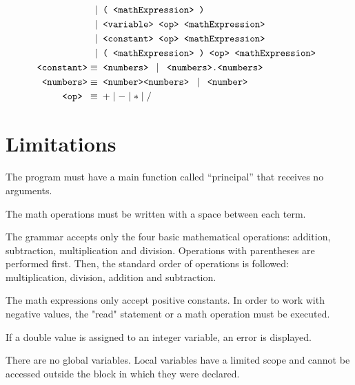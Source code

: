 \documentclass[11pt]{article}
\theoremstyle{definition}
\theoremstyle{remark}
\theoremstyle{remark}
\begin{document}
\begin{align*}
  \mid& \texttt{ ( \texttt{<mathExpression>} ) } \\
  \mid& \texttt{ <variable> <op> <mathExpression> } \\
  \mid& \texttt{ <constant> <op> <mathExpression> } \\
  \mid& \texttt{ ( <mathExpression> ) <op> <mathExpression> } \\
  \texttt{<constant>}
  \equiv& \texttt{ <numbers> } \mid \texttt{ <numbers>.<numbers> } \\
  \texttt{<numbers>}
  \equiv& \texttt{ <number><numbers> } \mid \texttt{ <number> } \\
  \texttt{ <op> }
  \equiv& \,\,\, + \mid - \mid * \mid /
\end{align*}

\section{Limitations}

The program must have a main function called ``principal'' that receives no
arguments.

The math operations must be written with a space between each term.

The grammar accepts only the four basic mathematical operations: addition,
subtraction, multiplication and division. Operations with parentheses are
performed first. Then, the standard order of operations is followed:
multiplication, division, addition and subtraction.

The math expressions only accept positive constants. In order to work with
negative values, the "read" statement or a math operation must be executed.

If a double value is assigned to an integer variable, an error is displayed.

There are no global variables. Local variables have a limited scope and cannot
be accessed outside the block in which they were declared.
\end{document}
